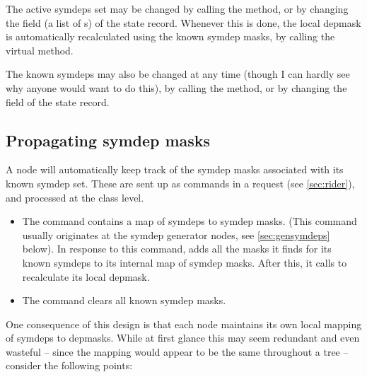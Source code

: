   The active symdeps set may be changed by calling the 
  method, or by changing the  field (a list of s)
  of the state record. Whenever this is done, the local depmask is
  automatically recalculated using the known symdep masks, by calling the
  virtual  method.

  The known symdeps may also be changed at any time (though I can hardly see
  why anyone would want to do this), by calling the 
  method, or by changing the   field of the state record. 
  
\subsection{Propagating symdep masks}

  A node will automatically keep track of the symdep masks associated with its
  known symdep set. These are sent up as commands in a request (see
  \ref{sec:rider}), and processed at the  class level.

  \begin{itemize}
  
  \item The  command contains a map of symdeps to symdep
    masks. (This command usually originates at the symdep generator nodes, see
    \ref{sec:gensymdeps} below). In response to this command,  adds
    all the masks it finds for its known symdeps to its internal map of symdep
    masks. After this, it calls  to recalculate its
    local depmask. 

  \item The  command clears all known symdep masks.
  
  \end{itemize}
  
  One consequence of this design is that each node maintains its own local
  mapping of symdeps to depmasks. While at first glance this may seem redundant
  and even wasteful -- since the mapping would appear to be the same throughout
  a tree -- consider the following points:

